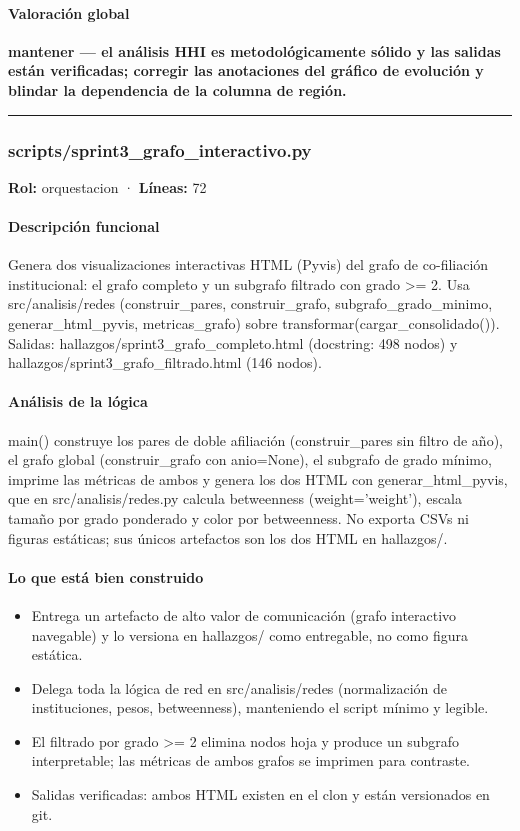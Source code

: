 \paragraph{Valoración global}
\textbf{mantener --- el análisis HHI es metodológicamente sólido y las salidas están verificadas; corregir las anotaciones del gráfico de evolución y blindar la dependencia de la columna de región.}

\medskip
\hrule

\subsubsection{scripts/sprint3\_grafo\_interactivo.py}
\textbf{Rol:} orquestacion · \textbf{Líneas:} 72

\paragraph{Descripción funcional}
Genera dos visualizaciones interactivas HTML (Pyvis) del grafo de co-filiación institucional: el grafo completo y un subgrafo filtrado con grado >= 2. Usa src/analisis/redes (construir\_pares, construir\_grafo, subgrafo\_grado\_minimo, generar\_html\_pyvis, metricas\_grafo) sobre transformar(cargar\_consolidado()). Salidas: hallazgos/sprint3\_grafo\_completo.html (docstring: 498 nodos) y hallazgos/sprint3\_grafo\_filtrado.html (146 nodos).

\paragraph{Análisis de la lógica}
main() construye los pares de doble afiliación (construir\_pares sin filtro de año), el grafo global (construir\_grafo con anio=None), el subgrafo de grado mínimo, imprime las métricas de ambos y genera los dos HTML con generar\_html\_pyvis, que en src/analisis/redes.py calcula betweenness (weight='weight'), escala tamaño por grado ponderado y color por betweenness. No exporta CSVs ni figuras estáticas; sus únicos artefactos son los dos HTML en hallazgos/.

\paragraph{Lo que está bien construido}
\begin{itemize}
  \item Entrega un artefacto de alto valor de comunicación (grafo interactivo navegable) y lo versiona en hallazgos/ como entregable, no como figura estática.
  \item Delega toda la lógica de red en src/analisis/redes (normalización de instituciones, pesos, betweenness), manteniendo el script mínimo y legible.
  \item El filtrado por grado >= 2 elimina nodos hoja y produce un subgrafo interpretable; las métricas de ambos grafos se imprimen para contraste.
  \item Salidas verificadas: ambos HTML existen en el clon y están versionados en git.
\end{itemize}

